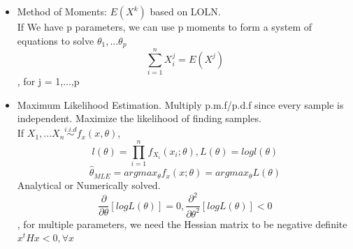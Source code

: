 \documentclass[11pt, openany]{book}              %
\begin{document}
\begin{itemize}
    \item Method of Moments: $E(X^k)$ based on LOLN.\\ 
    	If We have p parameters, we can use p moments to form a system of equations to solve $\theta_1,...\theta_p$
    	$$\sum_{i=1}^n X_i^j= E(X^j)$$, for j = 1,...,p
    \item Maximum Likelihood Estimation. Multiply p.m.f/p.d.f since every sample is independent. Maximize the likelihood of finding samples. \\ If $X_1,...X_n \stackrel{i.i.d}{\sim} f_x(x, \theta)$, 
    	$$ l(\theta) =  \prod_{i=1}^n f_{X_i} (x_i; \theta), L(\theta ) = log l(\theta)$$
    	$$ \hat{\theta}_{MLE}= argmax_{\theta} f_x(x;\theta ) = argmax_{\theta} L(\theta )$$
    	Analytical or Numerically solved. $$ \frac{\partial}{\partial \theta} [log L(\theta ) ] = 0, \frac{\partial^2}{\partial \theta^2} [log L(\theta ) ] < 0$$, for multiple parameters, we need the Hessian matrix to be negative definite $x^tHx<0, \forall x$ 
    	

\end{itemize}
\end{document}
